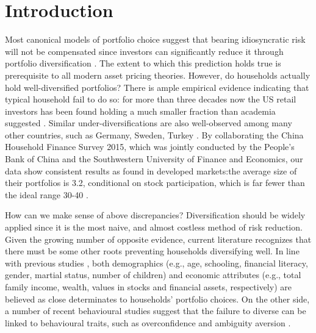\documentclass[ukenglish,nottitlepage,thmsb,11pt,letterpaper]{article}
\renewcommand{\thefootnote}{\fnsymbol{footnote}}
\begin{document}
\clearpage
\renewcommand{\thefootnote}{\arabic{footnote}}

\section{Introduction}

Most canonical models of portfolio choice suggest that bearing idiosyncratic risk will not be compensated since investors can significantly reduce it through portfolio diversification \citep{Markowitz1952}. The extent to which this prediction holds true is prerequisite to all modern asset pricing theories. However, do households actually hold well-diversified portfolios? There is ample empirical  evidence indicating that typical household fail to do so: for more than three decades now the US retail investors has been found holding a much smaller fraction than academia suggested \citep[e.g.,][]{Blume1975,Goetzmann2008,Dimmock2016}. Similar under-diversifications are also well-observed among many other countries, such as Germany, Sweden, Turkey \citep{Dorn2009,Anderson2013,Fuertes2014}. By collaborating the China Household Finance Survey 2015, which was jointly conducted by the People's Bank of China and the Southwestern University of Finance and Economics, our data show consistent results as found in developed markets:the average size of their portfolios is 3.2, conditional on stock participation, which is far fewer than the ideal range 30-40 \citep{Statman1987}.

How can we make sense of above discrepancies? Diversification should be widely applied since it is the most naive, and almost costless method of risk reduction. Given the growing number of opposite evidence, current literature recognizes that there must be some other roots preventing households diversifying well. In line with previous studies \citep{Guiso2002,Campbell2006,Goetzmann2008,Kumar2008,Rooij2011,Gaudecker2015}, both demographics (e.g., age, schooling, financial literacy, gender, martial status, number of children) and economic attributes (e.g., total family income, wealth, values in stocks and financial assets, respectively) are believed as close determinates to households' portfolio choices. On the other side, a number of recent behavioural studies suggest that the failure to diverse can be linked to behavioural traits, such as overconfidence \citep{Gaudecker2015,Fuertes2014} and ambiguity aversion \citep{Dimmock2016}.
\end{document}
